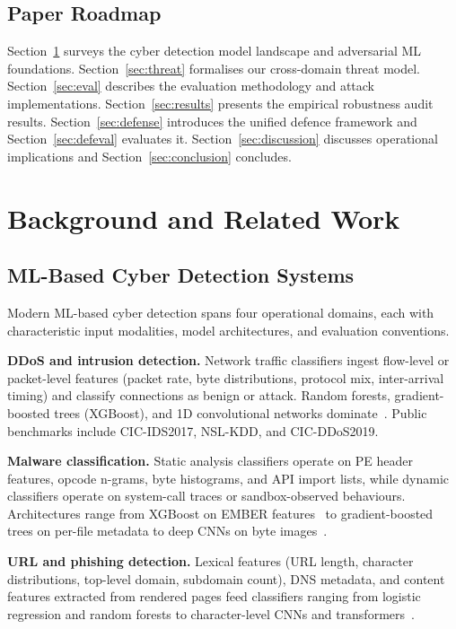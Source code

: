 \documentclass[sigconf,nonacm]{acmart}
\begin{document}
\subsection{Paper Roadmap}

Section~\ref{sec:background} surveys the cyber detection model landscape and
adversarial ML foundations. Section~\ref{sec:threat} formalises our cross-domain
threat model. Section~\ref{sec:eval} describes the evaluation methodology and
attack implementations. Section~\ref{sec:results} presents the empirical
robustness audit results. Section~\ref{sec:defense} introduces the unified
defence framework and Section~\ref{sec:defeval} evaluates it.
Section~\ref{sec:discussion} discusses operational implications and
Section~\ref{sec:conclusion} concludes.

\section{Background and Related Work}
\label{sec:background}

\subsection{ML-Based Cyber Detection Systems}

Modern ML-based cyber detection spans four operational domains, each with
characteristic input modalities, model architectures, and evaluation conventions.

\textbf{DDoS and intrusion detection.} Network traffic classifiers ingest
flow-level or packet-level features (packet rate, byte distributions, protocol
mix, inter-arrival timing) and classify connections as benign or attack. Random
forests, gradient-boosted trees (XGBoost), and 1D convolutional networks
dominate~\cite{cicids2017,kitsune2018}. Public benchmarks include CIC-IDS2017,
NSL-KDD, and CIC-DDoS2019.

\textbf{Malware classification.} Static analysis classifiers operate on PE
header features, opcode n-grams, byte histograms, and API import lists, while
dynamic classifiers operate on system-call traces or sandbox-observed
behaviours. Architectures range from XGBoost on EMBER
features~\cite{anderson2018ember} to gradient-boosted trees on per-file
metadata to deep CNNs on byte images~\cite{nataraj2011malimg}.

\textbf{URL and phishing detection.} Lexical features (URL length, character
distributions, top-level domain, subdomain count), DNS metadata, and content
features extracted from rendered pages feed classifiers ranging from logistic
regression and random forests to character-level CNNs and
transformers~\cite{phishtank,sahingoz2019phishing}.
\end{document}
